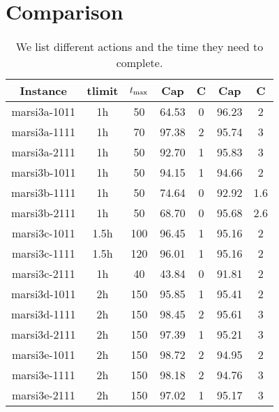 \section{Comparison}


\begin{table}
    \begin{center}
        \begin{tabular}{|c|c|c|c|c|c|c|}
            \hline
            Instance & tlimit & $t_{\max}$ & Cap & C & Cap & C\\
            \hline
            marsi3a-1011 & 1h & 50 & 64.53 & 0 & 96.23 & 2\\
            marsi3a-1111 & 1h & 70 & 97.38 & 2 & 95.74 & 3\\
            marsi3a-2111 & 1h & 50 & 92.70 & 1 & 95.83 & 3\\
            marsi3b-1011 & 1h & 50 & 94.15 & 1 & 94.66 & 2\\
            marsi3b-1111 & 1h & 50 & 74.64 & 0 & 92.92 & 1.6\\
            marsi3b-2111 & 1h & 50 & 68.70 & 0 & 95.68 & 2.6\\
            marsi3c-1011 & 1.5h & 100 & 96.45 & 1 & 95.16 & 2\\
            marsi3c-1111 & 1.5h & 120 & 96.01 & 1 & 95.16 & 2\\
            marsi3c-2111 & 1h & 40 & 43.84 & 0 & 91.81 & 2\\
            marsi3d-1011 & 2h & 150 & 95.85 & 1 & 95.41 & 2\\
            marsi3d-1111 & 2h & 150 & 98.45 & 2 & 95.61 & 3\\
            marsi3d-2111 & 2h & 150 & 97.39 & 1 & 95.21 & 3\\
            marsi3e-1011 & 2h & 150 & 98.72 & 2 & 94.95 & 2\\
            marsi3e-1111 & 2h & 150 & 98.18 & 2 & 94.76 & 3\\
            marsi3e-2111 & 2h & 150 & 97.02 & 1 & 95.17 & 3\\
            \hline
        \end{tabular}
        \caption{We list different actions and the time they need to complete.}
        \label{tbl:compare}
    \end{center}
\end{table}
